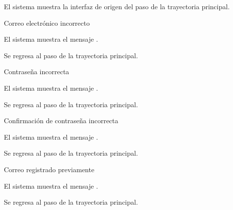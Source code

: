 {\begin{trayectoriaAlternativa}
    \item El sistema muestra la interfaz de origen del paso
       de la trayectoria principal.

  \end{trayectoriaAlternativa}


  \begin{trayectoriaAlternativa}
    {Correo electrónico incorrecto}

    \item El sistema muestra el mensaje
      .

    \item Se regresa al paso  de la trayectoria
      principal.

  \end{trayectoriaAlternativa}


  \begin{trayectoriaAlternativa}
    {Contraseña incorrecta}

    \item El sistema muestra el mensaje
      .

    \item Se regresa al paso  de la trayectoria
      principal.

  \end{trayectoriaAlternativa}


  \begin{trayectoriaAlternativa}
    {Confirmación de contraseña incorrecta}

    \item El sistema muestra el mensaje
      .

    \item Se regresa al paso  de la trayectoria
      principal.

  \end{trayectoriaAlternativa}


  \begin{trayectoriaAlternativa}
    {Correo registrado previamente}

    \item El sistema muestra el mensaje
      .

    \item Se regresa al paso  de la trayectoria
      principal.

  \end{trayectoriaAlternativa}

}
